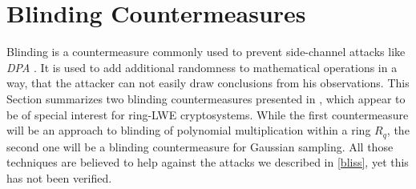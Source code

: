 %
%

\chapter{Blinding Countermeasures}
Blinding is a countermeasure commonly used to prevent side-channel attacks like \textit{\ac{DPA}} \cite{DBLP:conf/crypto/KocherJJ99}. It is used to add additional randomness to mathematical operations in a way, that the attacker can not easily draw conclusions from his observations. This Section summarizes two blinding countermeasures presented in \cite{cryptoeprint:2016:276}, which appear to be of special interest for \ac{ring-LWE} cryptosystems. While the first countermeasure will be an approach to blinding of polynomial multiplication within a ring \(R_q\), the second one will be a blinding countermeasure for Gaussian sampling. All those techniques are believed to help against the attacks we described in \ref{bliss}, yet this has not been verified.

